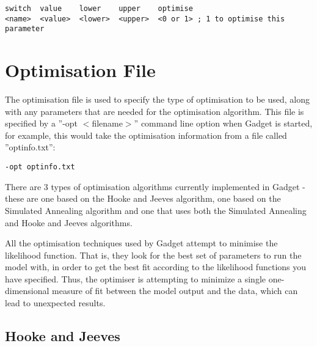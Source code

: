 \documentclass [a4paper, 10pt]{book}
\begin{document}
{\small\begin{verbatim}
switch  value    lower    upper    optimise
<name>  <value>  <lower>  <upper>  <0 or 1> ; 1 to optimise this parameter
\end{verbatim}}

\chapter{Optimisation File}\label{chap:optim}
The optimisation file is used to specify the type of optimisation to be used, along with any parameters that are needed for the optimisation algorithm.  This file is specified by a ''-opt $<$filename$>$'' command line option when Gadget is started, for example, this would take the optimisation information from a file called ''optinfo.txt'':

{\small\begin{verbatim}
-opt optinfo.txt
\end{verbatim}}

There are 3 types of optimisation algorithms currently implemented in Gadget - these are one based on the Hooke and Jeeves algorithm, one based on the Simulated Annealing algorithm and one that uses both the Simulated Annealing and Hooke and Jeeves algorithms.

\bigskip
All the optimisation techniques used by Gadget attempt to minimise the likelihood function. That is, they look for the best set of parameters to run the model with, in order to get the best fit according to the likelihood functions you have specified.  Thus, the optimiser is attempting to minimize a single one-dimensional measure of fit between the model output and the data, which can lead to unexpected results.

\section{Hooke and Jeeves}\label{sec:hooke}
\end{document}
